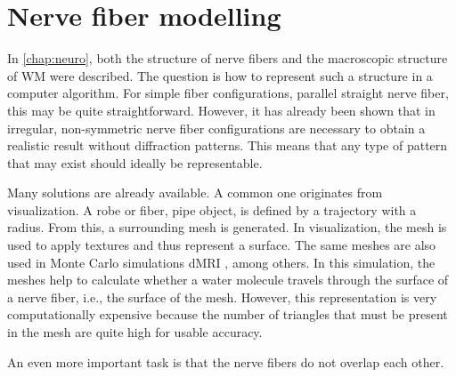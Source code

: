 \setcounter{chapter}{3}
\chapter{Nerve fiber modelling}
\label{chap:sof:modelling}
% 
\par
In \cref{chap:neuro}, both the structure of nerve fibers and the macroscopic structure of \ac{WM} were described.
The question is how to represent such a structure in a computer algorithm.
For simple fiber configurations, \eg{} parallel straight nerve fiber, this may be quite straightforward.
However, it has already been shown that in \dummy{} \cite{MenzelDissertation} irregular, non-symmetric nerve fiber configurations are necessary to obtain a realistic result without diffraction patterns.
This means that any type of pattern that may exist should ideally be representable.
\par
% 
Many solutions are already available.
A common one originates from visualization.
A robe or fiber, \ie{} pipe object, is defined by a trajectory with a radius.
From this, a surrounding mesh is generated.
In visualization, the mesh is used to apply textures and thus represent a surface. 
The same meshes are also used in Monte Carlo simulations \ac{dMRI} \cite{Ginsburger2019,ginsburgerDis2019}, among others.
In this simulation, the meshes help to calculate whether a water molecule travels through the surface of a nerve fiber, i.e., the surface of the mesh. 
However, this representation is very computationally expensive because the number of triangles that must be present in the mesh are quite high for usable accuracy.
\par
% 
An even more important task is that the nerve fibers do not overlap each other.

